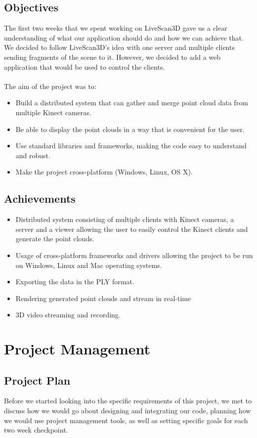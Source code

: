 \documentclass{article}
\begin{document}
\subsection{Objectives}
The first two weeks that we spent working on LiveScan3D gave us a clear understanding of what our application
should do and how we can achieve that. We decided to follow LiveScan3D's idea with one server and multiple
clients sending fragments of the scene to it. However, we decided to add a web application that would be used
to control the clients.
\\\\
The aim of the project was to:
\begin{itemize}
  \item Build a distributed system that can gather and merge point cloud data from multiple Kinect cameras.
  \item Be able to display the point clouds in a way that is convenient for the user.
  \item Use standard libraries and frameworks, making the code easy to understand and robust.
  \item Make the project cross-platform (Windows, Linux, OS X).
\end{itemize}

\subsection{Achievements}
\begin{itemize}
  \item Distributed system consisting of multiple clients with Kinect cameras, a server and a viewer allowing the user to easily control the Kinect clients and generate the point clouds.
  \item Usage of cross-platform frameworks and drivers allowing the project to be run on Windows, Linux and Mac operating systems.
  \item Exporting the data in the PLY format.
  \item Rendering generated point clouds and stream in real-time
  \item 3D video streaming and recording.
\end{itemize}

\newpage
\section{Project Management}
\subsection{Project Plan}
Before we started looking into the specific requirements of this project, we met to discuss how we would go about designing and integrating our code, planning how we would use project management tools, as well as setting specific goals for each two week checkpoint.
\end{document}
